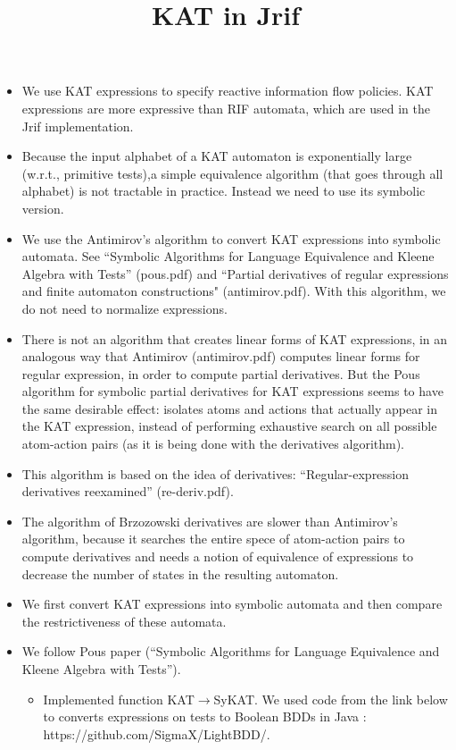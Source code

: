 \documentclass[10pt]{article}
\title{KAT in Jrif}
\begin{document}
\maketitle
\begin{itemize}
\item We use KAT expressions to specify reactive information flow policies. KAT expressions are more expressive than RIF automata, which are used in the Jrif implementation.
\item Because the input alphabet of a KAT automaton is exponentially large (w.r.t., primitive tests),a simple equivalence algorithm (that goes through all alphabet) is not tractable in practice. Instead we need to use its symbolic version.
\item We use the Antimirov's algorithm to convert KAT expressions into symbolic automata. See ``Symbolic Algorithms for Language Equivalence and Kleene Algebra with Tests'' (pous.pdf) and ``Partial derivatives of regular expressions and finite automaton constructions" (antimirov.pdf). With this algorithm, we do not need to normalize expressions.
\item There is not an algorithm that creates linear forms of KAT expressions, in an analogous way that Antimirov (antimirov.pdf) computes linear forms for regular expression, in order to compute partial derivatives. But the Pous algorithm for symbolic partial derivatives for KAT expressions seems to have the same desirable effect: isolates atoms and actions that actually appear in the KAT expression, instead of performing exhaustive search on all possible atom-action pairs (as it is being done with the derivatives algorithm).
\item This algorithm is based on the idea of derivatives: ``Regular-expression derivatives reexamined'' (re-deriv.pdf).
\item  The algorithm of Brzozowski derivatives are slower than Antimirov's algorithm, because it searches the entire spece of atom-action pairs to compute derivatives and needs a notion of equivalence of expressions to decrease the number of states in the resulting automaton.
\item We first convert KAT expressions into symbolic automata and then compare the restrictiveness of these automata.
\item We follow Pous paper (``Symbolic Algorithms for Language Equivalence and Kleene Algebra with Tests'').
\begin{itemize}
\item Implemented function KAT$\rightarrow$SyKAT. We used code from the link below to  converts expressions on tests to Boolean BDDs in Java : https://github.com/SigmaX/LightBDD/.

\end{itemize}
\end{itemize}
\end{document}
